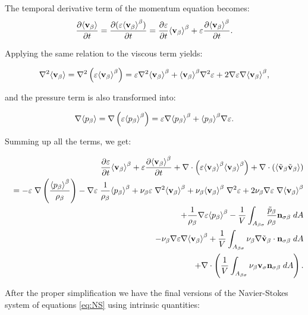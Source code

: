 \noindent The temporal derivative term of the momentum equation becomes:
$$
\derp{\means{\vb}}{t} = \derp{(\varepsilon\meani{\vb})}{t} = \derp{\varepsilon}{t}\meani{\vb} + \varepsilon \derp{\meani{\vb}}{t}.
$$

Applying the same relation to the viscous term yields:

\begin{equation}
	\nabla^2 \means{\vb} = \nabla^2 \left( \varepsilon \meani{\vb} \right) = \varepsilon \nabla^2 \meani{\vb} + \meani{\vb} \nabla^2 \varepsilon +2 \nabla \varepsilon \nabla \meani{\vb},
\end{equation}

and the pressure term is also transformed into:

\begin{equation}
\nabla \means{\pb} = \nabla \left( \varepsilon \meani{\pb} \right) = \varepsilon \nabla \meani{\pb} + \meani{\pb} \nabla \varepsilon.
\end{equation}

Summing up all the terms, we get:

\begin{eqnarray}
&& \derp{\varepsilon}{t}\meani{\vb} + \varepsilon \derp{\meani{\vb}}{t} + \nabla \cdot \left(\varepsilon \meani{\vb}\meani{\vb}\right)   + \nabla \cdot \left(\means{\vbt \vbt}\right)  \nonumber \\
&&= -\varepsilon \; \nabla \left(\dfrac{\meani{\pb}}{\rho_{\beta}}\right) - \nabla \varepsilon \; \dfrac{1}{\rho_{\beta}} \meani{\pb}  + \nub \varepsilon \; \nabla^2 \meani{\vb} + \nub \meani{\vb} \; \nabla^2 \varepsilon + 2 \nub \nabla \varepsilon \; \nabla \meani{\vb} \nonumber \\
&&+\dfrac{1}{\rho_{\beta}}\nabla\varepsilon \meani{\pb} - \dfrac{1}{V} \int_{A_{\beta \sigma}} \dfrac{\pbt}{\rho_{\beta}} \nbs \;dA \nonumber \\
&&- \nub \nabla \varepsilon \nabla \meani{\vb} + \dfrac{1}{V} \int_{A_{\beta \sigma}} \nub \nabla \vbt \cdot \nbs \;dA \nonumber \\
&& + \nabla \cdot \left( \dfrac{1}{V} \int_{A_{\beta \sigma}}  \nub \ws \nbs \;dA \right).
\end{eqnarray}

After the proper simplification we have the final versions of the Navier-Stokes system of equations \eqref{eq:NS} using intrinsic quantities:

